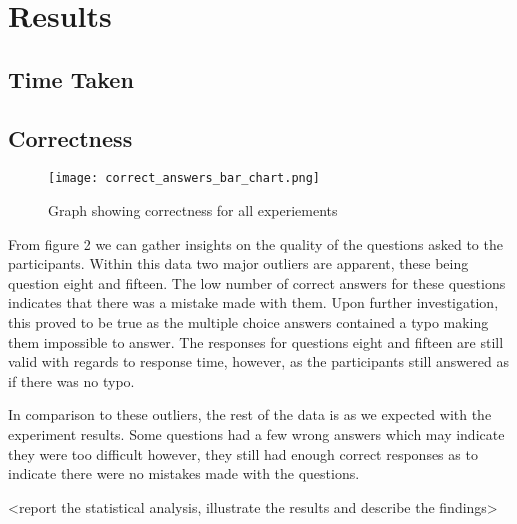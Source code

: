 \section{Results}
\subsection*{Time Taken}
\begin{flushleft}
    
\end{flushleft}
\subsection*{Correctness}
\begin{figure}[H]
    \centering
    \texttt{[image: correct\_answers\_bar\_chart.png]}
    \caption{Graph showing correctness for all experiements}
\end{figure}
\begin{flushleft}
    From figure 2 we can gather insights on the quality of the questions asked to the participants.
    Within this data two major outliers are apparent, these being question eight and fifteen. The low number of 
    correct answers for these questions indicates that there was a mistake made with them. Upon further investigation,
    this proved to be true as the multiple choice answers contained a typo making them impossible to answer. The responses for questions eight and fifteen 
    are still valid with regards to response time, however, as the participants still answered as if there was no typo.

    In comparison to these outliers, the rest of the data is as we expected with the experiment results. Some questions had a few wrong answers which may indicate they were too difficult
    however, they still had enough correct responses as to indicate there were no mistakes made with the questions.
\end{flushleft}
<report the statistical analysis, illustrate the results and describe the findings>
